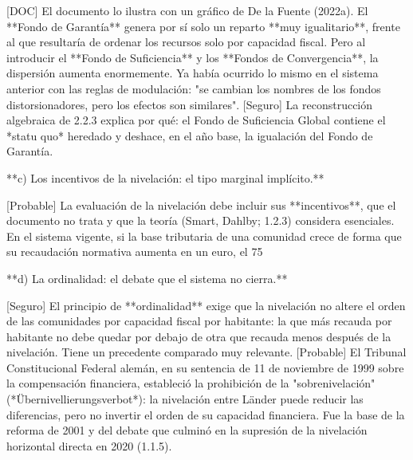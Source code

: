 \documentclass[10pt,a4paper]{article}
\begin{document}
[DOC] El documento lo ilustra con un gráfico de De la Fuente (2022a). El **Fondo de Garantía** genera por sí solo un reparto **muy igualitario**, frente al que resultaría de ordenar los recursos solo por capacidad fiscal. Pero al introducir el **Fondo de Suficiencia** y los **Fondos de Convergencia**, la dispersión aumenta enormemente. Ya había ocurrido lo mismo en el sistema anterior con las reglas de modulación: "se cambian los nombres de los fondos distorsionadores, pero los efectos son similares". [Seguro] La reconstrucción algebraica de 2.2.3 explica por qué: el Fondo de Suficiencia Global contiene el *statu quo* heredado y deshace, en el año base, la igualación del Fondo de Garantía.

**c) Los incentivos de la nivelación: el tipo marginal implícito.**

[Probable] La evaluación de la nivelación debe incluir sus **incentivos**, que el documento no trata y que la teoría (Smart, Dahlby; 1.2.3) considera esenciales. En el sistema vigente, si la base tributaria de una comunidad crece de forma que su recaudación normativa aumenta en un euro, el 75%

**d) La ordinalidad: el debate que el sistema no cierra.**

[Seguro] El principio de **ordinalidad** exige que la nivelación no altere el orden de las comunidades por capacidad fiscal por habitante: la que más recauda por habitante no debe quedar por debajo de otra que recauda menos después de la nivelación. Tiene un precedente comparado muy relevante. [Probable] El Tribunal Constitucional Federal alemán, en su sentencia de 11 de noviembre de 1999 sobre la compensación financiera, estableció la prohibición de la "sobrenivelación" (*Übernivellierungsverbot*): la nivelación entre Länder puede reducir las diferencias, pero no invertir el orden de su capacidad financiera. Fue la base de la reforma de 2001 y del debate que culminó en la supresión de la nivelación horizontal directa en 2020 (1.1.5).
\end{document}
